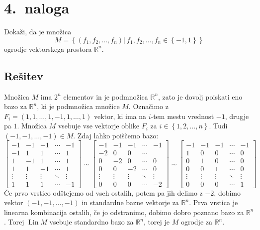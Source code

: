 \documentclass[a4,11pt]{article}
\newcommand{\R}{\mathbb{R}}
\DeclareMathOperator{\Lin}{Lin}
\begin{document}
\section*{4.~naloga}
    Dokaži, da je množica 
    \[
        M = \left\{\left(f_1, f_2, \ldots, f_n\right) | \ f_1, f_2, \ldots, f_n \in \left\{-1, 1\right\}\right\}
    \]
    ogrodje vektorskega prostora \(\R^n\).

\subsection*{Rešitev}
    Množica \(M\) ima \(2^n\) elementov in je podmnožica \(\R^n\), zato je dovolj poiskati
    eno bazo za \(\R^n\), ki je podmnožica množice \(M\). Označimo z \(F_i = \left(1, 1, \ldots, 1, -1, 1, \ldots, 1\right)\)
    vektor, ki ima na \(i\)-tem mestu vrednost \(-1\), drugje pa \(1\). Množica \(M\) vsebuje vse vektorje oblike \(F_i\) 
    za \(i \in \left\{1, 2, \ldots, n\right\}\). Tudi \(\left(-1, -1, \ldots, -1\right) \in M\).
    Zdaj lahko poiščemo bazo:
    \[
        \begin{bmatrix}
            -1 & -1 & -1 & \cdots & -1 \\
            -1 & 1 & 1 & \cdots & 1 \\
            1 & -1 & 1 & \cdots & 1 \\
            1 & 1 & -1 & \cdots & 1 \\
            \vdots & \vdots & \vdots & \ddots & \vdots \\
            1 & 1 & 1 & \cdots & -1
        \end{bmatrix} \sim \begin{bmatrix}
            -1 & -1 & -1 & \cdots & -1 \\
            -2 & 0 & 0 & \cdots &  \\
            0 & -2 & 0 & \cdots & 0 \\
            0 & 0 & -2 & \cdots & 0 \\
            \vdots & \vdots & \vdots & \ddots & \vdots \\
            0 & 0 & 0 & \cdots & -2
        \end{bmatrix} \sim \begin{bmatrix}
            -1 & -1 & -1 & \cdots & -1 \\
            1 & 0 & 0 & \cdots & 0 \\
            0 & 1 & 0 & \cdots & 0 \\
            0 & 0 & 1 & \cdots & 0 \\
            \vdots & \vdots & \vdots & \ddots & \vdots \\
            0 & 0 & 0 & \cdots & 1
        \end{bmatrix}
    \]
    Če prvo vrstico odštejemo od vseh ostalih, potem pa jih delimo z \(-2\), 
    dobimo vektor \(\left(-1, -1, \ldots, -1\right)\) in standardne bazne vektorje za \(\R^n\).
    Prva vrstica je linearna kombinacija ostalih, če jo odstranimo, dobimo dobro poznano bazo za \(\R^n\).
    Torej \(\Lin M\) vsebuje standardno bazo za \(\R^n\), torej je \(M\) ogrodje za \(\R^n\).
\end{document}
